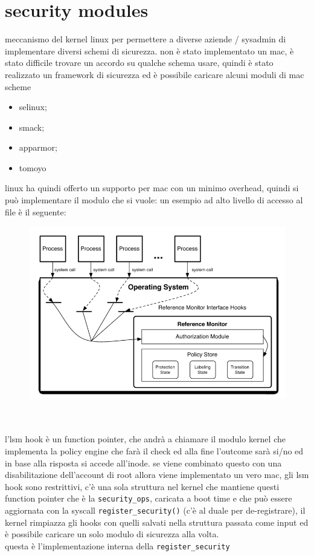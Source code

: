 \documentclass[12pt, oneside]{extbook} %
\begin{document}
\section{security modules}
meccanismo del kernel linux per permettere a diverse aziende / sysadmin di implementare diversi schemi di sicurezza. non è stato implementato un mac, è stato difficile trovare un accordo su qualche schema usare, quindi è stato realizzato un framework di sicurezza ed è possibile caricare alcuni moduli di mac scheme
\begin{itemize}
\item selinux;
\item smack;
\item apparmor;
\item tomoyo
\end{itemize}
linux ha quindi offerto un supporto per mac con un minimo overhead, quindi si può implementare il modulo che si vuole: un esempio ad alto livello di accesso al file è il seguente:\\
\begin{figure}[!h]
	\includegraphics[scale=0.3]{immagini/ref_monitor.png}
\end{figure}\\\\
l'lsm hook è un function pointer, che andrà a chiamare il modulo kernel che implementa la policy engine che farà il check ed alla fine l'outcome sarà si/no ed in base alla risposta si accede all'inode. se viene combinato questo con una disabilitazione dell'account di root allora viene implementato un vero mac, gli lsm hook sono restrittivi, c'è una sola struttura nel kernel che mantiene questi function pointer che è la \texttt{security\_ops}, caricata a boot time e che può essere aggiornata con la syscall \texttt{register\_security()} (c'è al duale per de-registrare), il kernel rimpiazza gli hooks con quelli salvati nella struttura passata come input ed è possibile caricare un solo modulo di sicurezza alla volta.\\questa è l'implementazione interna della \texttt{register\_security}
\end{document}
